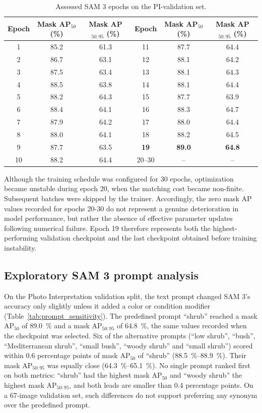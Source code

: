 \documentclass[12pt,a4paper]{article}
\begin{document}
\begin{table}[ht]
    \centering
    \caption{
        Assessed SAM 3 epochs on the PI-validation set.
    }
    \label{tab:sam3_epochs}
    \begin{tabular}{ccc@{\qquad}ccc}
        \toprule
        Epoch & Mask AP$_{50}$ (\%) & Mask AP$_{50:95}$ (\%) & Epoch & Mask AP$_{50}$ (\%) & Mask AP$_{50:95}$ (\%) \\
        \midrule
        1 & 85.2 & 61.3 & 11 & 87.7 & 64.4 \\
        2 & 86.7 & 63.1 & 12 & 88.1 & 64.2 \\
        3 & 87.5 & 63.4 & 13 & 88.1 & 64.3 \\
        4 & 88.5 & 63.8 & 14 & 88.1 & 64.4 \\
        5 & 88.2 & 64.3 & 15 & 87.7 & 63.9 \\
        6 & 88.4 & 64.1 & 16 & 88.3 & 64.7 \\
        7 & 87.9 & 64.2 & 17 & 88.0 & 64.4 \\
        8 & 88.0 & 64.1 & 18 & 88.2 & 64.5 \\
        9 & 87.7 & 63.5 & \textbf{19} & \textbf{89.0} & \textbf{64.8} \\
        10 & 88.2 & 64.4 & 20--30 & -- & -- \\
        \bottomrule
    \end{tabular}
\end{table}

Although the training schedule was configured for 30 epochs, optimization became unstable during epoch 20, when the matching cost became non-finite. Subsequent batches were skipped by the trainer. Accordingly, the zero mask AP values recorded for epochs 20-30 do not represent a genuine deterioration in model performance, but rather the absence of effective parameter updates following numerical failure. Epoch 19 therefore represents both the highest-performing validation checkpoint and the last checkpoint obtained before training instability.

\subsection{Exploratory SAM 3 prompt analysis}

On the Photo Interpretation validation split, the text prompt changed SAM 3's accuracy only slightly unless it added a color or condition modifier (Table~\ref{tab:prompt_sensitivity}). The predefined prompt ``shrub'' reached a mask AP$_{50}$ of \qty{89.0}{\percent} and a mask AP$_{50:95}$ of \qty{64.8}{\percent}, the same values recorded when the checkpoint was selected. Six of the alternative prompts (``low shrub'', ``bush'', ``Mediterranean shrub'', ``small bush'', ``woody shrub'' and ``small shrub'') scored within 0.6 percentage points of mask AP$_{50}$ of ``shrub'' (\qtyrange{88.5}{88.9}{\percent}). Their mask AP$_{50:95}$ was equally close (\qtyrange{64.3}{65.1}{\percent}). No single prompt ranked first on both metrics: ``shrub'' had the highest mask AP$_{50}$ and ``woody shrub'' the highest mask AP$_{50:95}$, and both leads are smaller than 0.4 percentage points. On a 67-image validation set, such differences do not support preferring any synonym over the predefined prompt.
\end{document}
